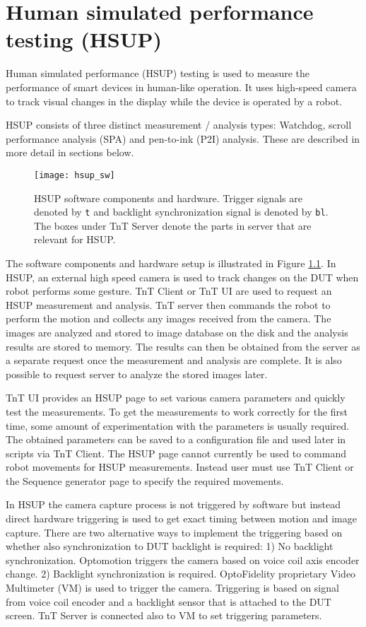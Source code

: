 \chapter{Human simulated performance testing (HSUP)}
\label{sec:HSUP}

Human simulated performance (HSUP) testing is used to measure the performance of smart devices in human-like operation. It uses high-speed camera to track visual changes in the display while the device is operated by a robot.

HSUP consists of three distinct measurement / analysis types: Watchdog, scroll performance analysis (SPA) and pen-to-ink (P2I) analysis. These are described in more detail in sections below.

\begin{figure}[!h]
	\centering
	\texttt{[image: hsup\_sw]}
	\caption{HSUP software components and hardware. Trigger signals are denoted by \texttt{t} and backlight synchronization signal is denoted by \texttt{bl}. The boxes under TnT Server denote the parts in server that are relevant for HSUP.}
	\label{fig:hsup_sw}
\end{figure}

The software components and hardware setup is illustrated in Figure \ref{fig:hsup_sw}. In HSUP, an external high speed camera is used to track changes on the DUT when robot performs some gesture. TnT Client or TnT UI are used to request an HSUP measurement and analysis. TnT server then commands the robot to perform the motion and collects any images received from the camera. The images are analyzed and stored to image database on the disk and the analysis results are stored to memory. The results can then be obtained from the server as a separate request once the measurement and analysis are complete. It is also possible to request server to analyze the stored images later.

TnT UI provides an HSUP page to set various camera parameters and quickly test the measurements. To get the measurements to work correctly for the first time, some amount of experimentation with the parameters is usually required. The obtained parameters can be saved to a configuration file and used later in scripts via TnT Client. The HSUP page cannot currently be used to command robot movements for HSUP measurements. Instead user must use TnT Client or the Sequence generator page to specify the required movements.

In HSUP the camera capture process is not triggered by software but instead direct hardware triggering is used to get exact timing between motion and image capture. There are two alternative ways to implement the triggering based on whether also synchronization to DUT backlight is required: 1) No backlight synchronization. Optomotion triggers the camera based on voice coil axis encoder change. 2) Backlight synchronization is required. OptoFidelity proprietary Video Multimeter (VM) is used to trigger the camera. Triggering is based on signal from voice coil encoder and a backlight sensor that is attached to the DUT screen. TnT Server is connected also to VM to set triggering parameters.

